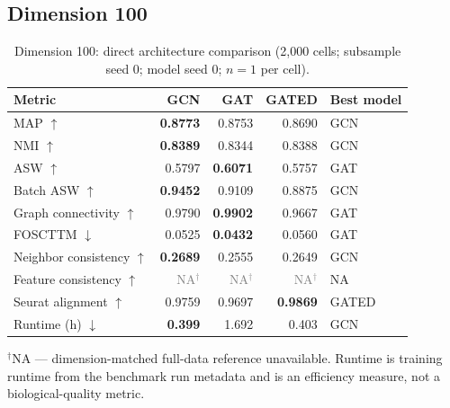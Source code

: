 \documentclass[10pt]{article}
\begin{document}
\subsection{Dimension 100}
\begin{table}[H]
\centering
\small
\caption{Dimension 100: direct architecture comparison (2,000 cells; subsample seed 0; model seed 0; $n=1$ per cell).}
\label{tab:dim100}
\begin{tabular}{@{}lrrrl@{}}
\toprule
Metric & GCN & GAT & GATED & Best model \\
\midrule
MAP $\uparrow$ & \textbf{0.8773} & 0.8753 & 0.8690 & GCN \\
NMI $\uparrow$ & \textbf{0.8389} & 0.8344 & 0.8388 & GCN \\
ASW $\uparrow$ & 0.5797 & \textbf{0.6071} & 0.5757 & GAT \\
Batch ASW $\uparrow$ & \textbf{0.9452} & 0.9109 & 0.8875 & GCN \\
Graph connectivity $\uparrow$ & 0.9790 & \textbf{0.9902} & 0.9667 & GAT \\
FOSCTTM $\downarrow$ & 0.0525 & \textbf{0.0432} & 0.0560 & GAT \\
Neighbor consistency $\uparrow$ & \textbf{0.2689} & 0.2555 & 0.2649 & GCN \\
Feature consistency $\uparrow$ & \textcolor{gray}{NA$^{\dagger}$} & \textcolor{gray}{NA$^{\dagger}$} & \textcolor{gray}{NA$^{\dagger}$} & NA \\
Seurat alignment $\uparrow$ & 0.9759 & 0.9697 & \textbf{0.9869} & GATED \\
Runtime (h) $\downarrow$ & \textbf{0.399} & 1.692 & 0.403 & GCN \\
\bottomrule
\end{tabular}
\begin{minipage}{0.92\linewidth}\footnotesize\vspace{2pt}$^{\dagger}$NA --- dimension-matched full-data reference unavailable. Runtime is training runtime from the benchmark run metadata and is an efficiency measure, not a biological-quality metric.\end{minipage}
\end{table}
\end{document}
